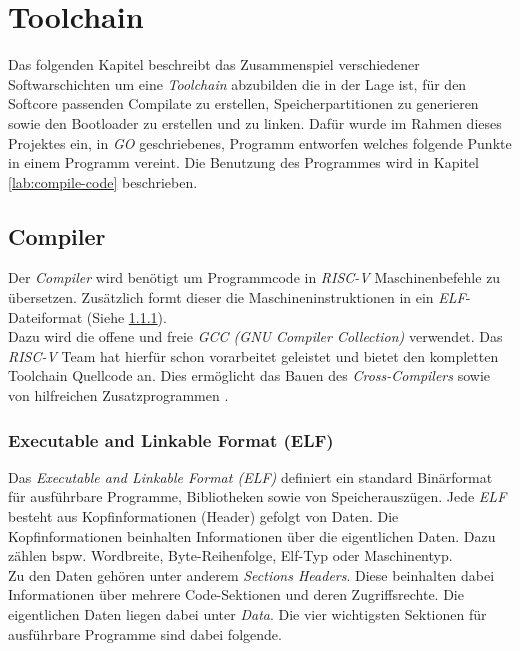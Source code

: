 \chapter{Toolchain}\label{lab:toolchain}

    Das folgenden Kapitel beschreibt das Zusammenspiel verschiedener Softwarschichten
    um eine \textit{Toolchain} abzubilden die in der Lage ist, für den Softcore passenden
    Compilate zu erstellen, Speicherpartitionen zu generieren sowie den Bootloader
    zu erstellen und zu linken.
    Dafür wurde im Rahmen dieses Projektes ein, in \textit{GO} geschriebenes, Programm
    entworfen welches folgende Punkte in einem Programm vereint.
    Die Benutzung des Programmes wird in Kapitel \ref{lab:compile-code} beschrieben.

    \section{Compiler}

        Der \textit{Compiler} wird benötigt um Programmcode
        in \textit{RISC-V} Maschinenbefehle zu übersetzen.
        Zusätzlich formt dieser die Maschineninstruktionen in ein \textit{ELF}-Dateiformat
        (Siehe \ref{lab:elf}).\\
        Dazu wird die offene und freie
        \textit{GCC (GNU Compiler Collection)} verwendet.
        Das \textit{RISC-V} Team hat hierfür schon vorarbeitet geleistet und bietet
        den kompletten Toolchain Quellcode an.
        Dies ermöglicht das Bauen des \textit{Cross-Compilers} sowie von hilfreichen
        Zusatzprogrammen \cite{riscv-toolchain}.
        
    \subsection{Executable and Linkable Format (ELF)}\label{lab:elf}
        Das \textit{Executable and Linkable Format (ELF)} definiert ein
        standard Binärformat für ausführbare Programme, Bibliotheken sowie von
        Speicherauszügen. Jede \textit{ELF} besteht aus Kopfinformationen (Header)
        gefolgt von Daten. Die Kopfinformationen beinhalten Informationen 
        über die eigentlichen Daten. Dazu zählen bspw. Wordbreite, Byte-Reihenfolge,
        Elf-Typ oder Maschinentyp.\\
        Zu den Daten gehören unter anderem \textit{Sections Headers}.
        Diese beinhalten dabei Informationen über mehrere Code-Sektionen
        und deren Zugriffsrechte. Die eigentlichen Daten liegen dabei unter \textit{Data}.
        Die vier wichtigsten Sektionen für ausführbare Programme sind dabei folgende.
        
